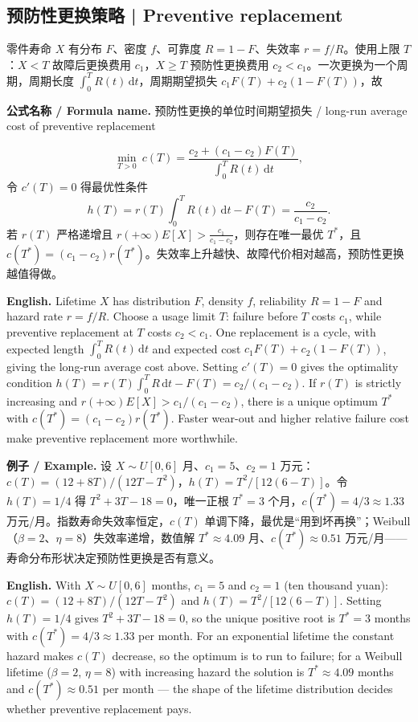 \documentclass[UTF8,11pt,a4paper]{ctexart}
\newcommand{\EN}[1]{\par\noindent\textbf{English.} #1\par}
\newcommand{\FORMULA}[2]{\par\noindent\textbf{公式名称 / Formula name.} #1 / #2\par}
\newcommand{\EX}[2]{\par\noindent\textbf{例子 / Example.} #1\par\EN{#2}}
\begin{document}
\subsection{预防性更换策略 | Preventive replacement}
零件寿命 $X$ 有分布 $F$、密度 $f$、可靠度 $R=1-F$、失效率 $r=f/R$。使用上限 $T$：$X<T$ 故障后更换费用 $c_1$，$X\ge T$ 预防性更换费用 $c_2<c_1$。一次更换为一个周期，周期长度 $\int_0^TR(t)\,\mathrm dt$，周期期望损失 $c_1F(T)+c_2(1-F(T))$，故
\FORMULA{预防性更换的单位时间期望损失}{long-run average cost of preventive replacement}
\[
\min_{T>0}\ c(T)=\frac{c_2+(c_1-c_2)F(T)}{\int_0^TR(t)\,\mathrm dt},
\]
令 $c'(T)=0$ 得最优性条件
\[
h(T)=r(T)\int_0^TR(t)\,\mathrm dt-F(T)=\frac{c_2}{c_1-c_2}.
\]
若 $r(T)$ 严格递增且 $r(+\infty)E[X]>\frac{c_1}{c_1-c_2}$，则存在唯一最优 $T^*$，且 $c(T^*)=(c_1-c_2)r(T^*)$。失效率上升越快、故障代价相对越高，预防性更换越值得做。
\EN{Lifetime $X$ has distribution $F$, density $f$, reliability $R=1-F$ and hazard rate $r=f/R$. Choose a usage limit $T$: failure before $T$ costs $c_1$, while preventive replacement at $T$ costs $c_2<c_1$. One replacement is a cycle, with expected length $\int_0^TR(t)\,\mathrm dt$ and expected cost $c_1F(T)+c_2(1-F(T))$, giving the long-run average cost above. Setting $c'(T)=0$ gives the optimality condition $h(T)=r(T)\int_0^TR\,\mathrm dt-F(T)=c_2/(c_1-c_2)$. If $r(T)$ is strictly increasing and $r(+\infty)E[X]>c_1/(c_1-c_2)$, there is a unique optimum $T^*$ with $c(T^*)=(c_1-c_2)r(T^*)$. Faster wear-out and higher relative failure cost make preventive replacement more worthwhile.}
\EX{设 $X\sim U[0,6]$ 月、$c_1=5$、$c_2=1$ 万元：$c(T)=(12+8T)/(12T-T^2)$，$h(T)=T^2/[12(6-T)]$。令 $h(T)=1/4$ 得 $T^2+3T-18=0$，唯一正根 $T^*=3$ 个月，$c(T^*)=4/3\approx1.33$ 万元/月。指数寿命失效率恒定，$c(T)$ 单调下降，最优是“用到坏再换”；Weibull（$\beta=2$、$\eta=8$）失效率递增，数值解 $T^*\approx4.09$ 月、$c(T^*)\approx0.51$ 万元/月——寿命分布形状决定预防性更换是否有意义。}{With $X\sim U[0,6]$ months, $c_1=5$ and $c_2=1$ (ten thousand yuan): $c(T)=(12+8T)/(12T-T^2)$ and $h(T)=T^2/[12(6-T)]$. Setting $h(T)=1/4$ gives $T^2+3T-18=0$, so the unique positive root is $T^*=3$ months with $c(T^*)=4/3\approx1.33$ per month. For an exponential lifetime the constant hazard makes $c(T)$ decrease, so the optimum is to run to failure; for a Weibull lifetime ($\beta=2$, $\eta=8$) with increasing hazard the solution is $T^*\approx4.09$ months and $c(T^*)\approx0.51$ per month — the shape of the lifetime distribution decides whether preventive replacement pays.}
\end{document}
